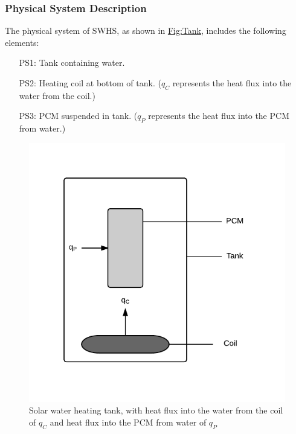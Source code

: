 \documentclass[12pt]{article}
\begin{document}
\subsubsection{Physical System Description}
\label{Sec:PhysSyst}
The physical system of SWHS, as shown in \hyperref[Figure:Tank]{Fig:Tank}, includes the following elements:
\begin{itemize}
\item[PS1:]Tank containing water.
\item[PS2:]Heating coil at bottom of tank. (${q_{C}}$ represents the heat flux into the water from the coil.)
\item[PS3:]PCM suspended in tank. (${q_{P}}$ represents the heat flux into the PCM from water.)
\end{itemize}
\begin{figure}
\begin{center}
\includegraphics[width=\textwidth]{../../../datafiles/SWHS/Tank.png}
\caption{Solar water heating tank, with heat flux into the water from the coil of ${q_{C}}$ and heat flux into the PCM from water of ${q_{P}}$}
\label{Figure:Tank}
\end{center}
\end{figure}
\end{document}
